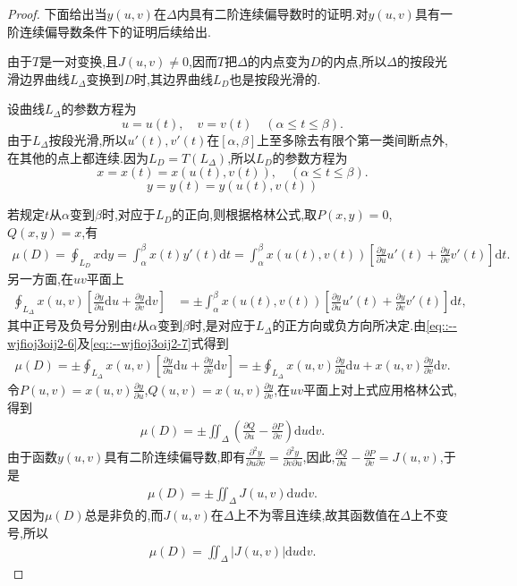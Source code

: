 \documentclass[../../main.tex]{subfiles}%
\begin{document}
\begin{proof}
下面给出当$y(u,v)$在$\Delta$内具有二阶连续偏导数时的证明.对$y(u,v)$具有一阶连续偏导数条件下的证明后续给出.

由于$T$是一对变换,且$J(u,v)\neq0$,因而$T$把$\Delta$的内点变为$D$的内点,所以$\Delta$的按段光滑边界曲线$L_{\Delta}$变换到$D$时,其边界曲线$L_D$也是按段光滑的.

设曲线$L_{\Delta}$的参数方程为
\[
u=u(t),\quad v=v(t)\quad(\alpha\leqslant t\leqslant\beta).
\]
由于$L_{\Delta}$按段光滑,所以$u'(t),v'(t)$在$[\alpha,\beta]$上至多除去有限个第一类间断点外,在其他的点上都连续.因为$L_D=T(L_{\Delta})$,所以$L_D$的参数方程为
\[
x=x(t)=x(u(t),v(t)),\quad(\alpha\leqslant t\leqslant\beta).
\]
\[
y=y(t)=y(u(t),v(t))
\]

若规定$t$从$\alpha$变到$\beta$时,对应于$L_D$的正向,则根据格林公式,取$P(x,y)=0$,$Q(x,y)=x$,有
\begin{align}\label{eq::--wjfioj3oij2-6}
\mu(D)=\oint_{L_D}x\mathrm{d}y=\int_{\alpha}^{\beta}x(t)y'(t)\mathrm{d}t=\int_{\alpha}^{\beta}x(u(t),v(t))\left[\frac{\partial y}{\partial u}u'(t)+\frac{\partial y}{\partial v}v'(t)\right]\mathrm{d}t.
\end{align}
另一方面,在$uv$平面上
\begin{align}\label{eq::--wjfioj3oij2-7}
\oint_{L_{\Delta}}x(u,v)\left[\frac{\partial y}{\partial u}\mathrm{d}u+\frac{\partial y}{\partial v}\mathrm{d}v\right]&=\pm\int_{\alpha}^{\beta}x(u(t),v(t))\left[\frac{\partial y}{\partial u}u'(t)+\frac{\partial y}{\partial v}v'(t)\right]\mathrm{d}t,
\end{align}
其中正号及负号分别由$t$从$\alpha$变到$\beta$时,是对应于$L_{\Delta}$的正方向或负方向所决定.由\eqref{eq::--wjfioj3oij2-6}及\eqref{eq::--wjfioj3oij2-7}式得到
\begin{align*}
\mu(D)=\pm\oint_{L_{\Delta}}x(u,v)\left[\frac{\partial y}{\partial u}\mathrm{d}u+\frac{\partial y}{\partial v}\mathrm{d}v\right]=\pm\oint_{L_{\Delta}}x(u,v)\frac{\partial y}{\partial u}\mathrm{d}u+x(u,v)\frac{\partial y}{\partial v}\mathrm{d}v.
\end{align*}
令$P(u,v)=x(u,v)\frac{\partial y}{\partial u}$,$Q(u,v)=x(u,v)\frac{\partial y}{\partial v}$,在$uv$平面上对上式应用格林公式,得到
\begin{align*}
\mu(D)=\pm\iint_{\Delta}\left(\frac{\partial Q}{\partial u}-\frac{\partial P}{\partial v}\right)\mathrm{d}u\mathrm{d}v.
\end{align*}
由于函数$y(u,v)$具有二阶连续偏导数,即有$\frac{\partial^2 y}{\partial u\partial v}=\frac{\partial^2 y}{\partial v\partial u}$,因此,$\frac{\partial Q}{\partial u}-\frac{\partial P}{\partial v}=J(u,v)$,于是
\begin{align*}
\mu(D)=\pm\iint_{\Delta}J(u,v)\mathrm{d}u\mathrm{d}v.
\end{align*}
又因为$\mu(D)$总是非负的,而$J(u,v)$在$\Delta$上不为零且连续,故其函数值在$\Delta$上不变号,所以
\begin{align*}
\mu(D)=\iint_{\Delta}|J(u,v)|\mathrm{d}u\mathrm{d}v.
\end{align*}

\end{proof}
\end{document}
